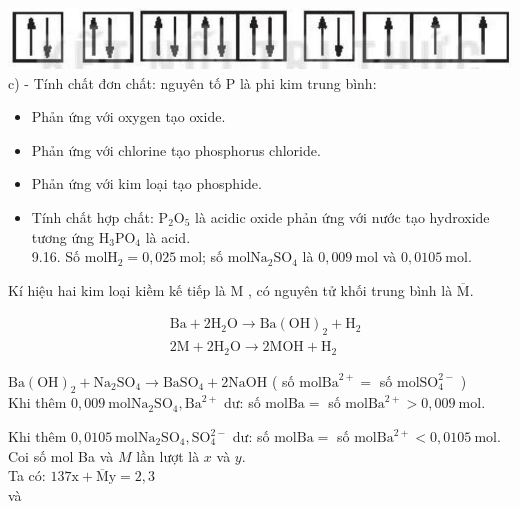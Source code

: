 \documentclass[10pt]{article}
\begin{document}
\includegraphics[max width=\textwidth, center]{2025_10_23_ee735750217b2aca435cg-21}\\
c) - Tính chất đơn chất: nguyên tố P là phi kim trung bình:

\begin{itemize}
  \item Phản ứng với oxygen tạo oxide.
  \item Phản ứng với chlorine tạo phosphorus chloride.
  \item Phản ứng với kim loại tạo phosphide.
\end{itemize}

\begin{itemize}
  \item Tính chất hợp chất: $\mathrm{P}_{2} \mathrm{O}_{5}$ là acidic oxide phản ứng với nước tạo hydroxide tương ứng $\mathrm{H}_{3} \mathrm{PO}_{4}$ là acid.\\
9.16. Số $\mathrm{mol} \mathrm{H}_{2}=0,025 \mathrm{~mol}$; số $\mathrm{mol} \mathrm{Na}_{2} \mathrm{SO}_{4}$ là $0,009 \mathrm{~mol}$ và $0,0105 \mathrm{~mol}$.
\end{itemize}

Kí hiệu hai kim loại kiềm kế tiếp là M , có nguyên tử khối trung bình là $\overline{\mathrm{M}}$.

$$
\begin{aligned}
& \mathrm{Ba}+2 \mathrm{H}_{2} \mathrm{O} \rightarrow \mathrm{Ba}(\mathrm{OH})_{2}+\mathrm{H}_{2} \\
& 2 \mathrm{M}+2 \mathrm{H}_{2} \mathrm{O} \rightarrow 2 \mathrm{MOH}+\mathrm{H}_{2}
\end{aligned}
$$

$\mathrm{Ba}(\mathrm{OH})_{2}+\mathrm{Na}_{2} \mathrm{SO}_{4} \rightarrow \mathrm{BaSO}_{4}+2 \mathrm{NaOH}$ ( số $\mathrm{mol} \mathrm{Ba}^{2+}=$ số $\mathrm{mol} \mathrm{SO}_{4}^{2-}$ )\\
Khi thêm $0,009 \mathrm{~mol} \mathrm{Na}_{2} \mathrm{SO}_{4}, \mathrm{Ba}^{2+}$ dư: số $\mathrm{mol} \mathrm{Ba}=$ số $\mathrm{mol} \mathrm{Ba}^{2+}>0,009 \mathrm{~mol}$.

Khi thêm $0,0105 \mathrm{~mol} \mathrm{Na}_{2} \mathrm{SO}_{4}, \mathrm{SO}_{4}^{2-}$ dư: số $\mathrm{mol} \mathrm{Ba}=$ số $\mathrm{mol} \mathrm{Ba}^{2+}<0,0105 \mathrm{~mol}$. Coi số mol Ba và $M$ lần lượt là $x$ và $y$.\\
Ta có: $137 \mathrm{x}+\overline{\mathrm{M}} \mathrm{y}=2,3$\\
và
\end{document}

